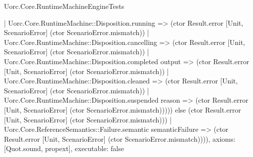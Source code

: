 \begin{lexlean}{Uorc.Core.RuntimeMachineEngineTests}
\begin{semanticmodule}
{            | Uorc.Core.RuntimeMachine::Disposition.running => (ctor Result.error [Unit, ScenarioError] (ctor ScenarioError.mismatch))
            | Uorc.Core.RuntimeMachine::Disposition.cancelling => (ctor Result.error [Unit, ScenarioError] (ctor ScenarioError.mismatch))
            | Uorc.Core.RuntimeMachine::Disposition.completed output => (ctor Result.error [Unit, ScenarioError] (ctor ScenarioError.mismatch))
            | Uorc.Core.RuntimeMachine::Disposition.cleaned => (ctor Result.error [Unit, ScenarioError] (ctor ScenarioError.mismatch))
            | Uorc.Core.RuntimeMachine::Disposition.suspended reason => (ctor Result.error [Unit, ScenarioError] (ctor ScenarioError.mismatch))))) else (ctor Result.error [Unit, ScenarioError] (ctor ScenarioError.mismatch)))
      | Uorc.Core.ReferenceSemantics::Failure.semantic semanticFailure => (ctor Result.error [Unit, ScenarioError] (ctor ScenarioError.mismatch)))),
  axioms: [Quot.sound, propext],
  executable: false
}


\end{semanticmodule}
\end{lexlean}
